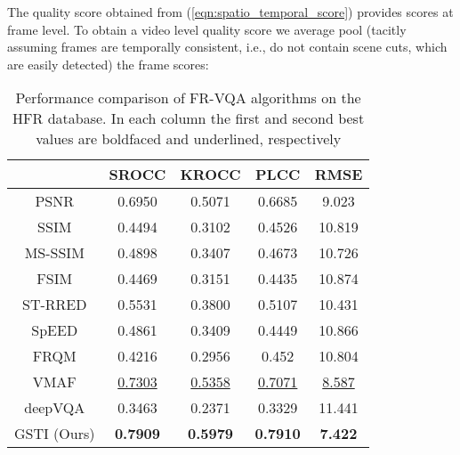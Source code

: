 \documentclass[journal]{IEEEtran}
\begin{document}
The quality score obtained from (\ref{eqn:spatio_temporal_score}) provides scores at frame level. To obtain a video level quality score we average pool (tacitly assuming frames are temporally consistent, i.e., do not contain scene cuts, which are easily detected) the frame scores:


\begin{table}[t]
\caption{Performance comparison of FR-VQA algorithms on the HFR database. In each column the first and second best values are boldfaced and underlined, respectively}
    \label{Table:MOS_comparison}
    \centering
    \begin{tabular}{|c||c|c|c|c|}
        \hline
        ~    & SROCC  & KROCC  & PLCC  & RMSE  \\ \hline \hline
        PSNR & 0.6950 & 0.5071 & 0.6685 & 9.023 \\ 
		SSIM \cite{wang2004image} & 0.4494 & 0.3102 & 0.4526 & 10.819 \\ 
		MS-SSIM \cite{wang2003multiscale} & 0.4898 & 0.3407 & 0.4673 & 10.726 \\ 
		FSIM \cite{zhang2011fsim} & 0.4469 & 0.3151 & 0.4435 & 10.874 \\ 
		ST-RRED \cite{soundararajan2012video} & 0.5531 & 0.3800 & 0.5107 & 10.431 \\ 
		SpEED \cite{bampis2017speed} & 0.4861 & 0.3409 & 0.4449 & 10.866 \\ 
		FRQM \cite{zhang2017frame} & 0.4216 & 0.2956 & 0.452 & 10.804 \\ 
		VMAF \cite{VMAF2016}& \underline{0.7303} & \underline{0.5358} & \underline{0.7071} & \underline{8.587} \\
		deepVQA \cite{kim2018deep} & 0.3463 & 0.2371 & 0.3329 & 11.441 \\
        GSTI (Ours) & \textbf{0.7909} & \textbf{0.5979} & \textbf{0.7910} & \textbf{7.422} \\
        \hline
    \end{tabular}
\end{table}
\end{document}
